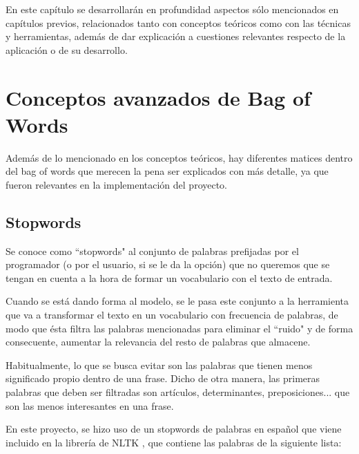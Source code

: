 
En este capítulo se desarrollarán en profundidad aspectos sólo mencionados en capítulos previos, relacionados tanto con conceptos teóricos como con las técnicas y herramientas, además de dar explicación a cuestiones relevantes respecto de la aplicación o de su desarrollo.

\section{Conceptos avanzados de Bag of Words}

Además de lo mencionado en los conceptos teóricos, hay diferentes matices dentro del bag of words que merecen la pena ser explicados con más detalle, ya que fueron relevantes en la implementación del proyecto.

\subsection{Stopwords}

Se conoce como ``stopwords" al conjunto de palabras prefijadas por el programador (o por el usuario, si se le da la opción) que no queremos que se tengan en cuenta a la hora de formar un vocabulario con el texto de entrada. 

Cuando se está dando forma al modelo, se le pasa este conjunto a la herramienta que va a transformar el texto en un vocabulario con frecuencia de palabras, de modo que ésta filtra las palabras mencionadas para eliminar el ``ruido" y de forma consecuente, aumentar la relevancia del resto de palabras que almacene.

Habitualmente, lo que se busca evitar son las palabras que tienen menos significado propio dentro de una frase. Dicho de otra manera, las primeras palabras que deben ser filtradas son artículos, determinantes, preposiciones... que son las menos interesantes en una frase.

En este proyecto, se hizo uso de un stopwords de palabras en español que viene incluido en la librería de NLTK \cite{nltk}, que contiene las palabras de la siguiente lista:

